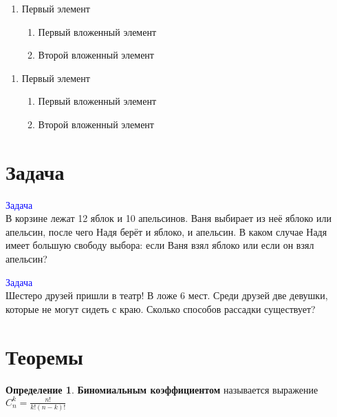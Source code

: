 \documentclass[12pt, a4paper]{article}
\theoremstyle{plain}              %
\theoremstyle{definition}         %
\newtheorem*{defin}{Определение}  %
\begin{document}
\begin{enumerate}
\item Первый элемент
  \begin{enumerate}
  \item Первый вложенный элемент
  \item Второй вложенный элемент
  \end{enumerate}
\end{enumerate}

\renewcommand{\labelenumi}{\arabic{enumi}}
\renewcommand{\labelenumii}{\arabic{enumi}.\arabic{enumii}}

\begin{enumerate}
\item Первый элемент
  \begin{enumerate}
  \item Первый вложенный элемент
  \item Второй вложенный элемент
  \end{enumerate}
\end{enumerate}



\section{Задача}

\newcommand{\ex}[1]{%
\addtocounter{i}{1}    %
\textcolor{blue}{Задача \\}
#1\\
}


\ex{В корзине лежат 12 яблок и 10 апельсинов. Ваня выбирает из неё яблоко или апельсин, после чего Надя берёт и яблоко, и апельсин. В каком случае Надя имеет большую свободу выбора: если Ваня взял яблоко или если он взял апельсин?}

\ex{Шестеро друзей пришли в театр! В ложе 6 мест. Среди друзей две девушки, которые не могут сидеть с краю. Сколько способов рассадки существует?}



\section{Теоремы}
\begin{defin}
\textbf{ Биномиальным коэффициентом} называется выражение $C_n^k = \frac{n!}{k!(n-k)!}$
\end{defin}
\end{document}
